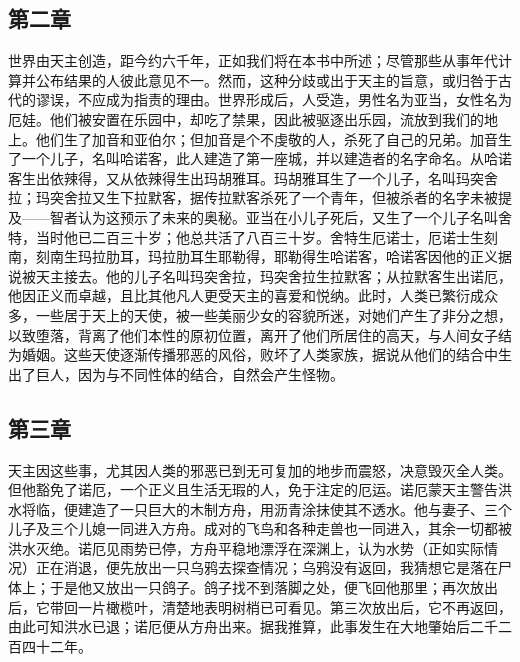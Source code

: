 
\subsection{第二章}

世界由天主创造，距今约六千年，正如我们将在本书中所述；尽管那些从事年代计算并公布结果的人彼此意见不一。然而，这种分歧或出于天主的旨意，或归咎于古代的谬误，不应成为指责的理由。世界形成后，人受造，男性名为亚当，女性名为厄娃。他们被安置在乐园中，却吃了禁果，因此被驱逐出乐园，流放到我们的地上。他们生了加音和亚伯尔；但加音是个不虔敬的人，杀死了自己的兄弟。加音生了一个儿子，名叫哈诺客，此人建造了第一座城，并以建造者的名字命名。从哈诺客生出依辣得，又从依辣得生出玛胡雅耳。玛胡雅耳生了一个儿子，名叫玛突舍拉；玛突舍拉又生下拉默客，据传拉默客杀死了一个青年，但被杀者的名字未被提及——智者认为这预示了未来的奥秘。亚当在小儿子死后，又生了一个儿子名叫舍特，当时他已二百三十岁；他总共活了八百三十岁。舍特生厄诺士，厄诺士生刻南，刻南生玛拉肋耳，玛拉肋耳生耶勒得，耶勒得生哈诺客，哈诺客因他的正义据说被天主接去。他的儿子名叫玛突舍拉，玛突舍拉生拉默客；从拉默客生出诺厄，他因正义而卓越，且比其他凡人更受天主的喜爱和悦纳。此时，人类已繁衍成众多，一些居于天上的天使，被一些美丽少女的容貌所迷，对她们产生了非分之想，以致堕落，背离了他们本性的原初位置，离开了他们所居住的高天，与人间女子结为婚姻。这些天使逐渐传播邪恶的风俗，败坏了人类家族，据说从他们的结合中生出了巨人，因为与不同性体的结合，自然会产生怪物。\par


\subsection{第三章}

天主因这些事，尤其因人类的邪恶已到无可复加的地步而震怒，决意毁灭全人类。但他豁免了诺厄，一个正义且生活无瑕的人，免于注定的厄运。诺厄蒙天主警告洪水将临，便建造了一只巨大的木制方舟，用沥青涂抹使其不透水。他与妻子、三个儿子及三个儿媳一同进入方舟。成对的飞鸟和各种走兽也一同进入，其余一切都被洪水灭绝。诺厄见雨势已停，方舟平稳地漂浮在深渊上，认为水势（正如实际情况）正在消退，便先放出一只乌鸦去探查情况；乌鸦没有返回，我猜想它是落在尸体上；于是他又放出一只鸽子。鸽子找不到落脚之处，便飞回他那里；再次放出后，它带回一片橄榄叶，清楚地表明树梢已可看见。第三次放出后，它不再返回，由此可知洪水已退；诺厄便从方舟出来。据我推算，此事发生在大地肇始后二千二百四十二年。\par

